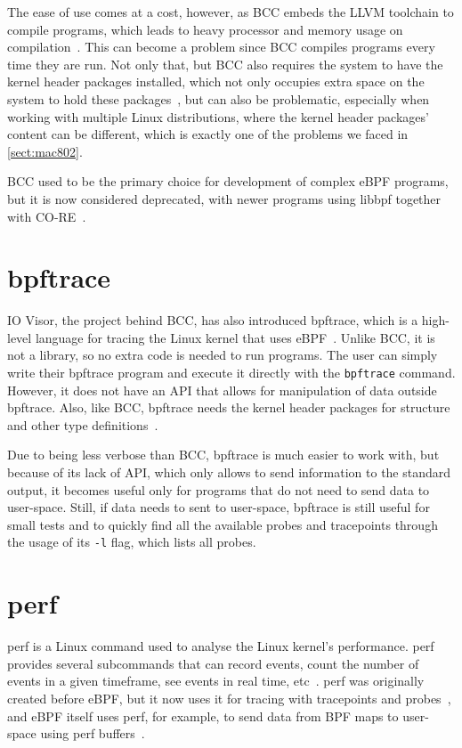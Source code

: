 The ease of use comes at a cost, however, as \ac{BCC} embeds the LLVM toolchain
to compile programs, which leads to heavy processor and memory usage on
compilation~\cite{pingcap,contain}. This can become a problem since \ac{BCC}
compiles programs every time they are run. Not only that, but \ac{BCC} also
requires the system to have the kernel header packages installed, which not only
occupies extra space on the system to hold these
packages~\cite{pingcap,contain}, but can also be problematic, especially when
working with multiple Linux distributions, where the kernel header packages'
content can be different, which is exactly one of the problems we faced in
\autoref{sect:mac802}.

BCC used to be the primary choice for development of complex eBPF programs, but
it is now considered deprecated, with newer programs using libbpf together with
\ac{CO-RE}~\cite{toolsfuture}.


\section{bpftrace}

IO Visor, the project behind \ac{BCC}, has also introduced bpftrace, which is a
high-level language for tracing the Linux kernel that uses eBPF~\cite{bpftrace}.
Unlike \ac{BCC}, it is not a library, so no extra code is needed to run
programs. The user can simply write their bpftrace program and execute it
directly with the \texttt{bpftrace} command. However, it does not have an API
that allows for manipulation of data outside bpftrace. Also, like \ac{BCC},
bpftrace needs the kernel header packages for structure and other type
definitions~\cite{bpftrace}.

Due to being less verbose than \ac{BCC}, bpftrace is much easier to work with,
but because of its lack of API, which only allows to send information to the
standard output, it becomes useful only for programs that do not need to send
data to user-space. Still, if data needs to sent to user-space, bpftrace is
still useful for small tests and to quickly find all the available probes and
tracepoints through the usage of its \texttt{-l} flag, which lists all probes.


\section{perf}

perf is a Linux command used to analyse the Linux kernel's performance. perf
provides several subcommands that can record events, count the number of events
in a given timeframe, see events in real time, etc~\cite{perf}. perf was
originally created before eBPF, but it now uses it for tracing with tracepoints
and probes~\cite{greggperf}, and eBPF itself uses perf, for example, to send
data from BPF maps to user-space using perf buffers~\cite{perfring}.


